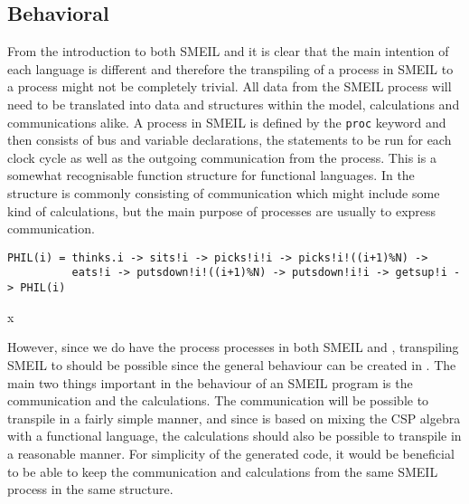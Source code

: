 \subsection{Behavioral}

From the introduction to both SMEIL and \cspm it is clear that the main intention of each language is different and therefore the transpiling of a process in SMEIL to a \cspm process might not be completely trivial. All data from the SMEIL process will need to be translated into data and structures within the \cspm model, calculations and communications alike.
A process in SMEIL is defined by the \texttt{proc} keyword and then consists of bus and variable declarations, the statements to be run for each clock cycle as well as the outgoing communication from the process. This is a somewhat recognisable function structure for functional languages. In \cspm the structure is commonly consisting of communication which might include some kind of calculations, but the main purpose of \cspm processes are usually to express communication. %

\begin{listing}
\begin{verbatim}
PHIL(i) = thinks.i -> sits!i -> picks!i!i -> picks!i!((i+1)%N) ->
          eats!i -> putsdown!i!((i+1)%N) -> putsdown!i!i -> getsup!i -> PHIL(i)

\end{verbatim}
\caption{x}
\label{x}
\end{listing}

However, since we do have the process processes in both SMEIL and \cspm, transpiling SMEIL to \cspm should be possible since the general behaviour can be created in \cspm. The main two things important in the behaviour of an SMEIL program is the communication and the calculations. The communication will be possible to transpile in a fairly simple manner, and since \cspm is based on mixing the CSP algebra with a functional language, the calculations should also be possible to transpile in a reasonable manner.
For simplicity of the generated code, it would be beneficial to be able to keep the communication and calculations from the same SMEIL process in the same \cspm structure.

